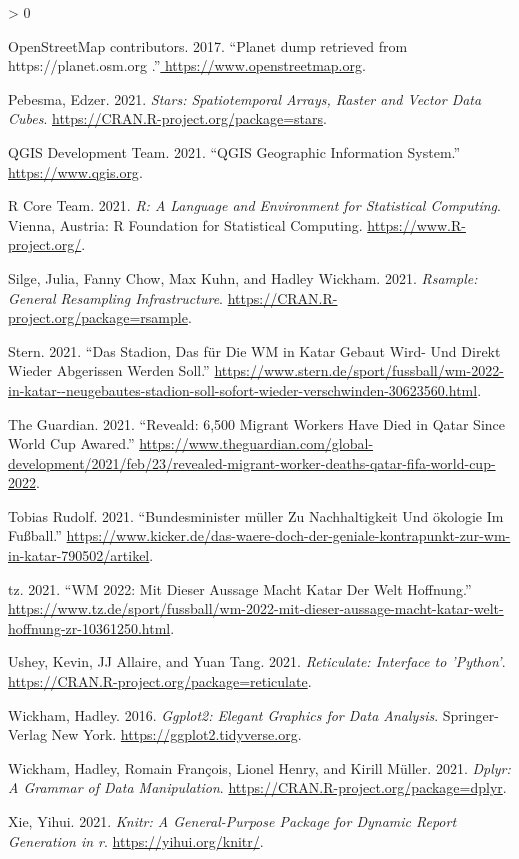 \documentclass[
]{article}
\newlength{\cslhangindent}
\newenvironment{CSLReferences}[2] %
 {%
  \setlength{\parindent}{0pt}
  \ifodd #1 \everypar{\setlength{\hangindent}{\cslhangindent}}\ignorespaces\fi
  \ifnum #2 > 0
  \setlength{\parskip}{#2\baselineskip}
  \fi
 }%
 {}
\begin{document}
\begin{CSLReferences}{1}{0}
\leavevmode\hypertarget{ref-OpenStreetMap}{}%
OpenStreetMap contributors. 2017. {``{Planet dump retrieved from
https://planet.osm.org
}.''}\href{\%20https://www.openstreetmap.org\%20}{ https://www.openstreetmap.org}.

\leavevmode\hypertarget{ref-stars}{}%
Pebesma, Edzer. 2021. \emph{Stars: Spatiotemporal Arrays, Raster and
Vector Data Cubes}. \url{https://CRAN.R-project.org/package=stars}.

\leavevmode\hypertarget{ref-QGISDevelopmentTeam.2021}{}%
QGIS Development Team. 2021. {``QGIS Geographic Information System.''}
\url{https://www.qgis.org}.

\leavevmode\hypertarget{ref-R}{}%
R Core Team. 2021. \emph{R: A Language and Environment for Statistical
Computing}. Vienna, Austria: R Foundation for Statistical Computing.
\url{https://www.R-project.org/}.

\leavevmode\hypertarget{ref-rsample}{}%
Silge, Julia, Fanny Chow, Max Kuhn, and Hadley Wickham. 2021.
\emph{Rsample: General Resampling Infrastructure}.
\url{https://CRAN.R-project.org/package=rsample}.

\leavevmode\hypertarget{ref-Stern}{}%
Stern. 2021. {``Das Stadion, Das für Die WM in Katar Gebaut Wird- Und
Direkt Wieder Abgerissen Werden Soll.''}
\url{https://www.stern.de/sport/fussball/wm-2022-in-katar--neugebautes-stadion-soll-sofort-wieder-verschwinden-30623560.html}.

\leavevmode\hypertarget{ref-TheGuardian.2021}{}%
The Guardian. 2021. {``Reveald: 6,500 Migrant Workers Have Died in Qatar
Since World Cup Awared.''}
\url{https://www.theguardian.com/global-development/2021/feb/23/revealed-migrant-worker-deaths-qatar-fifa-world-cup-2022}.

\leavevmode\hypertarget{ref-kicker}{}%
Tobias Rudolf. 2021. {``Bundesminister müller Zu Nachhaltigkeit Und
ökologie Im Fußball.''}
\url{https://www.kicker.de/das-waere-doch-der-geniale-kontrapunkt-zur-wm-in-katar-790502/artikel}.

\leavevmode\hypertarget{ref-tz}{}%
tz. 2021. {``WM 2022: Mit Dieser Aussage Macht Katar Der Welt
Hoffnung.''}
\url{https://www.tz.de/sport/fussball/wm-2022-mit-dieser-aussage-macht-katar-welt-hoffnung-zr-10361250.html}.

\leavevmode\hypertarget{ref-reticulate}{}%
Ushey, Kevin, JJ Allaire, and Yuan Tang. 2021. \emph{Reticulate:
Interface to 'Python'}.
\url{https://CRAN.R-project.org/package=reticulate}.

\leavevmode\hypertarget{ref-ggplot2}{}%
Wickham, Hadley. 2016. \emph{Ggplot2: Elegant Graphics for Data
Analysis}. Springer-Verlag New York.
\url{https://ggplot2.tidyverse.org}.

\leavevmode\hypertarget{ref-dplyr}{}%
Wickham, Hadley, Romain François, Lionel Henry, and Kirill Müller. 2021.
\emph{Dplyr: A Grammar of Data Manipulation}.
\url{https://CRAN.R-project.org/package=dplyr}.

\leavevmode\hypertarget{ref-knitrman}{}%
Xie, Yihui. 2021. \emph{Knitr: A General-Purpose Package for Dynamic
Report Generation in r}. \url{https://yihui.org/knitr/}.

\end{CSLReferences}
\end{document}
